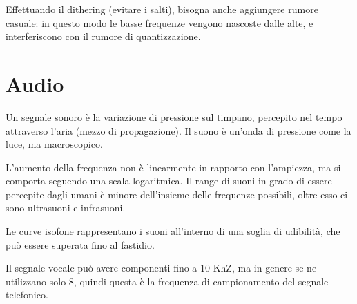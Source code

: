 Effettuando il dithering (evitare i salti), bisogna anche aggiungere rumore casuale: in questo modo le basse frequenze vengono nascoste dalle alte, e interferiscono con il rumore di quantizzazione.

\section{Audio}
Un segnale sonoro è la variazione di pressione sul timpano, percepito nel tempo attraverso l'aria (mezzo di propagazione). Il suono è un'onda di pressione come la luce, ma macroscopico.

L'aumento della frequenza non è linearmente in rapporto con l'ampiezza, ma si comporta seguendo una scala logaritmica. Il range di suoni in grado di essere percepite dagli umani è minore dell'insieme delle frequenze possibili, oltre esso ci sono ultrasuoni e infrasuoni. 

Le curve isofone rappresentano i suoni all'interno di una soglia di udibilità, che può essere superata fino al fastidio. 

Il segnale vocale può avere componenti fino a 10 KhZ, ma in genere se ne utilizzano solo 8, quindi questa è la frequenza di campionamento del segnale telefonico. 






